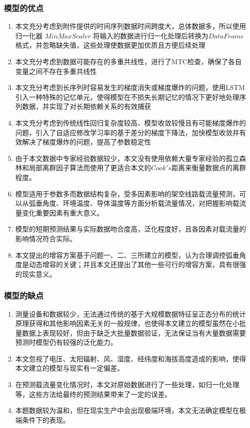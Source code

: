 \documentclass[withoutpreface,bwprint]{cumcmthesis}  %
\begin{document}
	\subsubsection{模型的优点}
	\begin{enumerate}
        \item 本文充分考虑到附件提供的时间序列数据时间跨度大，总体数据多，所以使用归一化器 $MinMaxScaler$ 将输入的数据进行归一化处理后转换为$DataFrame$格式，并忽略缺失值，这些处理使数据更加优质且方便后续处理
        \item 本文充分考虑到数据可能存在的多重共线性，进行了MTC检查，确保了各自变量之间不存在多重共线性
        \item 本文充分考虑到长序列时容易发生的梯度消失或梯度爆炸的问题，使用LSTM引入一种特殊的记忆单元，使得模型在不损失长期记忆的情况下更好地处理序列数据，并实现了对长期依赖关系的有效捕获
        \item 本文充分考虑到传统线性回归复杂度较高、模型收敛较慢且有可能梯度爆炸的问题，引入了自适应修改学习率的基于差分的梯度下降法，加快模型收敛并有效解决了梯度爆炸的问题，提高了参数稳定性
        \item 由于本文数据中专家经验数据较少，本文没有使用依赖大量专家经验的孤立森林和局部离群因子算法而使用了更适合本文的$Cook's$距离来衡量数据点的离群程度。
		\item 模型适用于参数多而数据结构复杂，受多因素影响的架空线路载流量预测，可以从弧垂角度、环境温度、导体温度等方面分析载流量情况，对把握影响载流量变化重要因素有重大意义。
		\item 模型的短期预测结果与实际数据吻合度高，泛化程度好，且各因素对载流量的影响情况符合实际。
        \item 本文提出的增容方案基于问题一、二、三所建立的模型，认为合理调控弧垂角度是动态增容的关键；并且本文还提出了其他一些可行的增容方案，具有很强的现实意义。
		
	\end{enumerate}
	\subsubsection{模型的缺点}
	\begin{enumerate}
		\item 测量设备和数据较少，无法通过传统的基于大规模数据特征呈正态分布的统计原理获得和其他影响因素无关的一般规律，也使得本文建立的模型虽然在小批量数据上表现较好，但由于缺乏大批量数据验证，无法保证当有大量数据需要预测时模型仍有较强的泛化能力。
		\item 本文忽视了电压、太阳辐射、风、湿度、经纬度和海拔高度造成的影响，使得本文建立的模型与现实有一定偏差。
		\item 在预测载流量变化情况时，本文对原始数据进行了一些处理，如归一化处理等，这些方法给最终的预测结果带来了一定的误差。
        \item 本题数据较为温和，但在现实生产中会出现极端环境，本文无法确定模型在极端条件下的表现。
	\end{enumerate}
	
\end{document}
